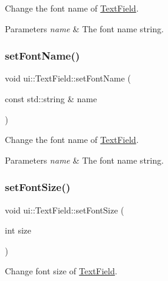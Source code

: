 Change the font name of \hyperlink{classui_1_1TextField}{Text\+Field}. 


\begin{DoxyParams}{Parameters}
{\em name} & The font name string. \\
\hline
\end{DoxyParams}
\mbox{\label{classui_1_1TextField_a0dc06b592621a2867e5e91cea01470db}} 
\subsubsection{\texorpdfstring{set\+Font\+Name()}{setFontName()}\hspace{0.1cm}{\footnotesize\ttfamily [2/2]}}
{\footnotesize\ttfamily void ui\+::\+Text\+Field\+::set\+Font\+Name (\begin{DoxyParamCaption}\item[{const std\+::string \&}]{name }\end{DoxyParamCaption})}



Change the font name of \hyperlink{classui_1_1TextField}{Text\+Field}. 


\begin{DoxyParams}{Parameters}
{\em name} & The font name string. \\
\hline
\end{DoxyParams}
\mbox{\label{classui_1_1TextField_afeac699e913b7fad0d171745c98f0915}} 
\subsubsection{\texorpdfstring{set\+Font\+Size()}{setFontSize()}\hspace{0.1cm}{\footnotesize\ttfamily [1/2]}}
{\footnotesize\ttfamily void ui\+::\+Text\+Field\+::set\+Font\+Size (\begin{DoxyParamCaption}\item[{int}]{size }\end{DoxyParamCaption})}



Change font size of \hyperlink{classui_1_1TextField}{Text\+Field}. 


